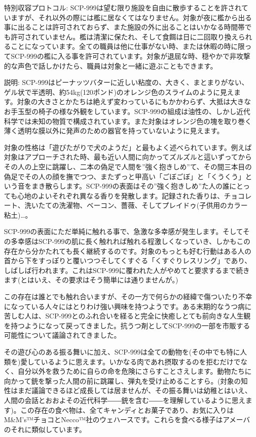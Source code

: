 \documentclass[10pt,a4paper]{report}
\begin{document}

特別収容プロトコル: SCP-999は望む限り施設を自由に散歩することを許されていますが、それ以外の際には檻に居なくてはなりません。対象が夜に檻から出る事に出ることは許可されておらず、また施設の外に出ることはいかなる時間帯でも許可されていません。檻は清潔に保たれ、そして食餌は日に二回取り換えられることになっています。全ての職員は他に仕事がない時、または休暇の時に限ってSCP-999の檻に入る事を許可されています。対象が退屈な時、穏やかで非攻撃的な声色で話しかけたら、職員は対象と一緒に遊ぶこともできます。

説明: SCP-999はピーナッツバターに近しい粘度の、大きく、まとまりがない、ゲル状で半透明、約54kg(120ポンド)のオレンジ色のスライムのように見えます。対象の大きさとかたちは絶えず変わっているにもかかわらず、大抵は大きなお手玉型の椅子の様な外観をしています。SCP-999の組成は油性の、しかし近代科学では未知の物質で構成されています。また対象はオレンジ色の塊を取り巻く薄く透明な膜以外に発声のための器官を持っていないように見えます。

対象の性格は「遊びたがりで犬のようだ」と最もよく述べられています。例えば対象はアプローチされた時、最も近い人間に向かってズルズルと這いずってからその人の上空に跳躍し、二本の偽足で人間を''強く抱きしめ''て、その間三本目の偽足でその人の顔を撫でつつ、またずっと甲高い「ごぼごぼ」と「くうくう」という音をまき散らします。SCP-999の表面はその''強く抱きしめ''た人の誰にとっても心地のよいそれぞれ異なる香りを発散します。記録された香りは、チョコレート、洗いたての洗濯物、ベーコン、薔薇、そしてプレイドゥ(子供用のカラー粘土)…。

SCP-999の表面にただ単純に触れる事で、急激な多幸感が発生します。そしてその多幸感はSCP-999の肌に長く触れれば触れる程激しくなっていき、しかもこの存在から分かたれても長く継続するのです。対象のもっとも好む行動はある人の首から下をすっぽりと覆いつつそしてくすぐる「くすぐりレスリング」であり、しばしば行われます。これはSCP-999に覆われた人がやめてと要求するまで続きます(とはいえ、その要求はそう簡単には通りませんが。)

この存在は誰とでも触れ合いますが、その一方で何らかの経緯で傷ついたり不幸になっている人々にはとりわけ強い興味を持つようです。ある末期的なうつ病に苦しむ人は、SCP-999とのふれ合いを経ると完全に快癒しとても前向きな人生観を持つようになって戻ってきました。抗うつ剤としてSCP-999の一部を市販する可能性について議論されてきました。

その遊び心のある振る舞いに加え、SCP-999は全ての動物を(その中でも特に人類を)愛しているように思えます。いかなる肉であれ摂取するのを拒むだけでなく、自分以外を救うために自らの命を危険にさらすことさえします。動物たちに向かって銃を撃った人間の前に跳躍し、弾丸を受け止めることすら。(対象の知性はまだ議論できるほど成長しては居ませんが、その振る舞いは幼稚とはいえ、人間の会話とおおよその近代科学――銃を含む――を理解しているように思えます)。この存在の食べ物は、全てキャンディとお菓子であり、お気に入りはM\&M's™チョコとNecco™社のウェハースです。これらを食べる様子はアメーバのそれに類似しています。


\layout
\end{document}
